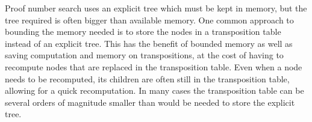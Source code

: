 Proof number search uses an explicit tree which must be kept in memory, but the tree required is often bigger than available memory. One common approach to bounding the memory needed is to store the nodes in a transposition table instead of an explicit tree. This has the benefit of bounded memory as well as saving computation and memory on transpositions, at the cost of having to recompute nodes that are replaced in the transposition table. Even when a node needs to be recomputed, its children are often still in the transposition table, allowing for a quick recomputation. In many cases the transposition table can be several orders of magnitude smaller than would be needed to store the explicit tree.








